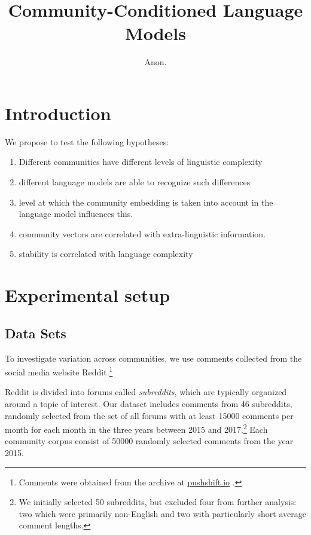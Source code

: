 \documentclass[11pt,a4paper]{article}
\title{Community-Conditioned Language Models}
\author{Anon.}
\date{}
\begin{document}
\maketitle
\begin{abstract}
\end{abstract}


\section{Introduction}

We propose to test the following hypotheses:

\begin{enumerate}
\item Different communities have different levels of linguistic
  complexity
\item different language models are able to recognize such differences
\item level at which the community embedding is taken into account in the language model influences this.
\item community vectors are correlated with extra-linguistic information.
\item stability is correlated with language complexity
\end{enumerate}

\section{Experimental setup}
\subsection{Data Sets}

To investigate variation across communities, we use comments collected 
from the social media website Reddit.\footnote{Comments were obtained 
from the archive at \href{https://pushshift.io/}{pushshift.io} \cite{Baumgartner2020}.}

Reddit is divided into forums called \textit{subreddits}, 
which are typically organized around a topic of interest. 
Our dataset includes comments from \num{46} subreddits, 
randomly selected from the set of all forums 
with at least \num{15000} comments per month for each month 
in the three years between 2015 and 2017.\footnote{
We initially selected \num{50} subreddits, 
but excluded four from further analysis: 
two which were primarily non-English and two with particularly short average comment lengths.}
Each community corpus consist of \num{50000} randomly selected comments from the year 2015.
\end{document}
